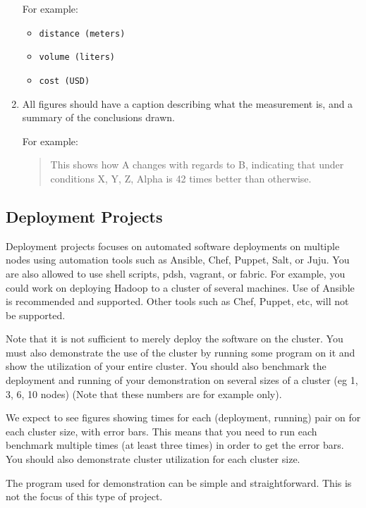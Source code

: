 \begin{enumerate}
  For example:

  \begin{itemize}
  \tightlist
  \item
    \texttt{distance\ (meters)}
  \item
    \texttt{volume\ (liters)}
  \item
    \texttt{cost\ (USD)}
  \end{itemize}
\item
  All figures should have a caption describing what the measurement is,
  and a summary of the conclusions drawn.

  For example:

  \begin{quote}
  This shows how A changes with regards to B, indicating that under
  conditions X, Y, Z, Alpha is 42 times better than otherwise.
  \end{quote}
\end{enumerate}

\subsection{Deployment Projects}\label{deployment-projects}

Deployment projects focuses on automated software deployments on
multiple nodes using automation tools such as Ansible, Chef, Puppet,
Salt, or Juju. You are also allowed to use shell scripts, pdsh, vagrant,
or fabric. For example, you could work on deploying Hadoop to a cluster
of several machines. Use of Ansible is recommended and supported. Other
tools such as Chef, Puppet, etc, will not be supported.

Note that it is not sufficient to merely deploy the software on the
cluster. You must also demonstrate the use of the cluster by running
some program on it and show the utilization of your entire cluster. You
should also benchmark the deployment and running of your demonstration
on several sizes of a cluster (eg 1, 3, 6, 10 nodes) (Note that these
numbers are for example only).

We expect to see figures showing times for each (deployment, running)
pair on for each cluster size, with error bars. This means that you need
to run each benchmark multiple times (at least three times) in order to
get the error bars. You should also demonstrate cluster utilization for
each cluster size.

The program used for demonstration can be simple and straightforward.
This is not the focus of this type of project.

